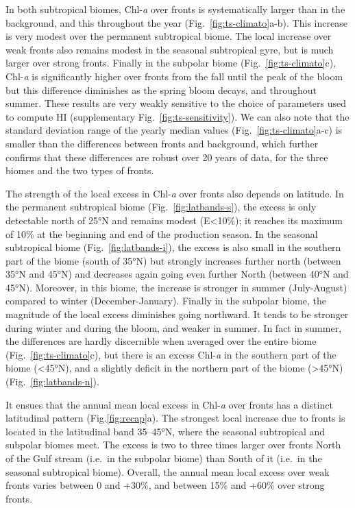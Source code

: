 In both subtropical biomes, Chl\nobreakdash-\emph{a} over fronts is systematically larger than in the background, and this throughout the year (Fig.~\ref{fig:ts-climato}a-b).
This increase is very modest over the permanent subtropical biome.
The local increase over weak fronts also remains modest in the seasonal subtropical gyre, but is much larger over strong fronts.
Finally in the subpolar biome (Fig.~\ref{fig:ts-climato}c), Chl\nobreakdash-\emph{a} is significantly higher over fronts from the fall until the peak of the bloom but this difference diminishes as the spring bloom decays, and throughout summer.
These results are very weakly sensitive to the choice of parameters used to compute HI (supplementary Fig.~\ref{fig:ts-sensitivity}).
We can also note that the standard deviation range of the yearly median values (Fig.~\ref{fig:ts-climato}a-c) is smaller than the differences between fronts and background, which further confirms that these differences are robust over 20 years of data, for the three biomes and the two types of fronts.

The strength of the local excess in Chl\nobreakdash-\emph{a} over fronts also depends on latitude.
In the permanent subtropical biome (Fig.~\ref{fig:latbands-s}), the excess is only detectable north of 25°N and remains modest (E<10\%); it reaches its maximum of 10\% at the beginning and end of the production season.
In the seasonal subtropical biome (Fig.~\ref{fig:latbands-i}), the excess is also small in the southern part of the biome (south of 35°N) but strongly increases further north (between 35°N and 45°N) and decreases again going even further North (between 40°N and 45°N).
Moreover, in this biome, the increase is stronger in summer (July-August) compared to winter (December-January).
Finally in the subpolar biome, the magnitude of the local excess diminishes going northward.
It tends to be stronger during winter and during the bloom, and weaker in summer.
In fact in summer, the differences are hardly discernible when averaged over the entire biome (Fig.~\ref{fig:ts-climato}c), but there is an excess Chl\nobreakdash-\emph{a} in the southern part of the biome (\textless45°N), and a slightly deficit in the northern part of the biome (\textgreater45°N) (Fig.~\ref{fig:latbands-n}).

It ensues that the annual mean local excess in Chl\nobreakdash-\emph{a} over fronts has a distinct latitudinal pattern (Fig.\ref{fig:recap}a).
The strongest local increase due to fronts is located in the latitudinal band 35--45°N, where the seasonal subtropical and subpolar biomes meet.
The excess is two to three times larger over fronts North of the Gulf stream (i.e.\ in the subpolar biome) than South of it (i.e.\ in the seasonal subtropical biome).
Overall, the annual mean local excess over weak fronts varies between 0 and +30\%, and between 15\% and +60\% over strong fronts.




